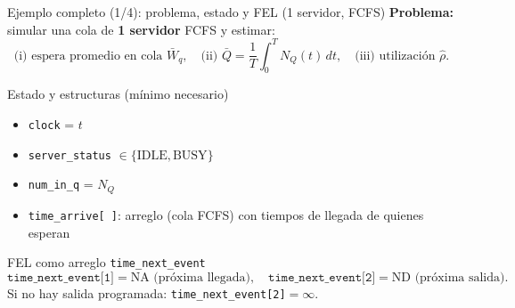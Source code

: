 \documentclass[aspectratio=1610, 9pt]{beamer}
\begin{document}

\begin{frame}[fragile]{Ejemplo completo (1/4): problema, estado y FEL (1 servidor, FCFS)}
\small
\textbf{Problema:} simular una cola de \textbf{1 servidor} FCFS y estimar:
\[
\text{(i) espera promedio en cola } \bar W_q,\quad
\text{(ii) } \bar Q=\frac{1}{T}\int_0^T N_Q(t)\,dt,\quad
\text{(iii) utilización } \hat\rho.
\]

\vspace{2pt}
\begin{block}{Estado y estructuras (mínimo necesario)}
\begin{itemize}
\item \texttt{clock} = $t$
\item \texttt{server\_status} $\in\{\text{IDLE},\text{BUSY}\}$
\item \texttt{num\_in\_q} = $N_Q$
\item \texttt{time\_arrive[\,]}: arreglo (cola FCFS) con tiempos de llegada de quienes esperan
\end{itemize}
\end{block}

\vspace{2pt}
\begin{block}{FEL como arreglo \texttt{time\_next\_event} }
\[
\texttt{time\_next\_event[1]}=\text{NA (próxima llegada)},\quad
\texttt{time\_next\_event[2]}=\text{ND (próxima salida)}.
\]
Si no hay salida programada: \texttt{time\_next\_event[2]}$=\infty$.
\end{block}
\end{frame}
\end{document}
